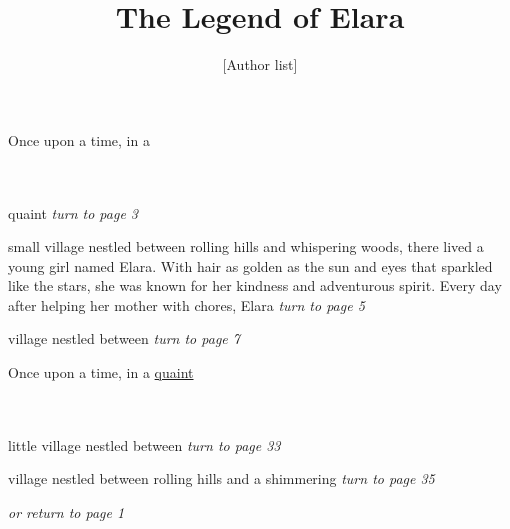 \documentclass{memoir}
\author{[Author list]}
\title{\HUGE The Legend of Elara}
\begin{document}
            \maketitle
            \thispagestyle{empty} 
            \mainmatter
            

        \hspace{1cm}\vfill
        \begin{minipage}{3in}
        \LARGE
        Once upon a time, in a \\ \vspace{5mm} \\
  \\ 

        \hspace{1cm}\begin{minipage}{6cm}
        \normalsize
            quaint  \hfill \textit{turn to page 3}\\ \vspace{5mm}

small village nestled between rolling hills and whispering woods, there lived a young girl named Elara. With hair as golden as the sun and eyes that sparkled like the stars, she was known for her kindness and adventurous spirit. Every day after helping her mother with chores, Elara \hfill \textit{turn to page 5}\\ \vspace{5mm}

village nestled between  \hfill \textit{turn to page 7}\\ \vspace{5mm}


        \end{minipage} 
        \end{minipage}
        \hspace{1cm}\vfill
        \cleardoublepage

        


        \hspace{1cm}\vfill
        \begin{minipage}{3in}
        \LARGE
        Once upon a time, in a \ul{quaint}\\ \vspace{5mm} \\
  \\ 

        \hspace{1cm}\begin{minipage}{6cm}
        \normalsize
            little village nestled between  \hfill \textit{turn to page 33}\\ \vspace{5mm}

village nestled between rolling hills and a shimmering  \hfill \textit{turn to page 35}\\ \vspace{5mm}

\hfill \textit{or return to page 1}
        \end{minipage} 
        \end{minipage}
        \hspace{1cm}\vfill
        \cleardoublepage
\end{document}

